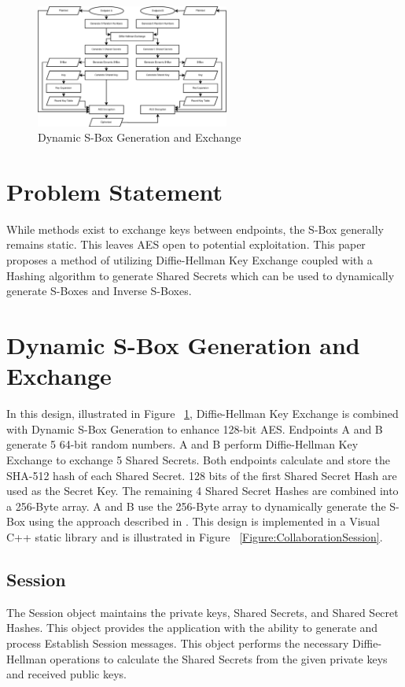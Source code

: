 \documentclass[journal]{IEEEtran}
\begin{document}
\begin{figure}[!t]
	\centering
	\includegraphics[width=2.5in]{AESDynamicSBox}
	\caption{Dynamic S-Box Generation and Exchange}
	\label{Figure:DynamicSBoxExchange}
\end{figure}

\section{Problem Statement}
While methods exist to exchange keys between endpoints, the S-Box generally remains static. This leaves AES
open to potential exploitation. This paper proposes a method of utilizing Diffie-Hellman Key Exchange coupled
with a Hashing algorithm to generate Shared Secrets which can be used to dynamically generate S-Boxes and 
Inverse S-Boxes.

\section{Dynamic S-Box Generation and Exchange}
In this design, illustrated in Figure ~\ref{Figure:DynamicSBoxExchange}, Diffie-Hellman Key Exchange is combined with Dynamic S-Box Generation to enhance 128-bit AES. Endpoints A and B generate 5 64-bit random numbers. A and B perform Diffie-Hellman Key Exchange to exchange 5 Shared Secrets. Both endpoints calculate and store the SHA-512 hash of each Shared Secret. 128 bits of the first Shared Secret Hash are used as the Secret Key. The remaining 4 Shared Secret Hashes are combined into a 256-Byte array. A and B use the 256-Byte array to dynamically generate the S-Box using the approach described in \cite{AESKeySBox}. This design is implemented in a Visual C++ static library and is illustrated in Figure ~\ref{Figure:CollaborationSession}.

\subsection{Session}
The Session object maintains the private keys, Shared Secrets, and Shared Secret Hashes. This object provides the application with the ability to generate and process Establish Session messages. This object performs the necessary Diffie-Hellman operations to calculate the Shared Secrets from the given private keys and received public keys. 
\end{document}
